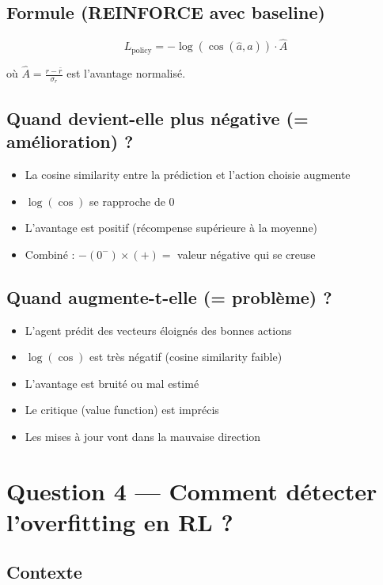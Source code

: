 \documentclass[11pt,a4paper]{article}
\begin{document}
\subsection{Formule (REINFORCE avec baseline)}

\begin{equation}
L_{\text{policy}} = -\log(\cos(\hat{a}, a)) \cdot \hat{A}
\end{equation}

où $\hat{A} = \frac{r - \bar{r}}{\sigma_r}$ est l'avantage normalisé.

\subsection{Quand devient-elle plus négative (= amélioration) ?}

\begin{itemize}
    \item La cosine similarity entre la prédiction et l'action choisie augmente
    \item $\log(\cos)$ se rapproche de 0
    \item L'avantage est positif (récompense supérieure à la moyenne)
    \item Combiné : $-(0^-) \times (+) = $ valeur négative qui se creuse
\end{itemize}

\subsection{Quand augmente-t-elle (= problème) ?}

\begin{itemize}
    \item L'agent prédit des vecteurs éloignés des bonnes actions
    \item $\log(\cos)$ est très négatif (cosine similarity faible)
    \item L'avantage est bruité ou mal estimé
    \item Le critique (value function) est imprécis
    \item Les mises à jour vont dans la mauvaise direction
\end{itemize}

\section{Question 4 — Comment détecter l'overfitting en RL ?}

\subsection{Contexte}
\end{document}
